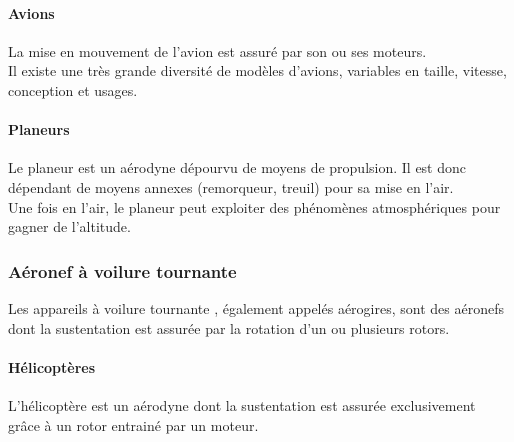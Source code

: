 		\paragraph{Avions}
		La mise en mouvement de l'avion  est assuré par son ou ses moteurs. \\
		
		Il existe une très grande diversité de modèles d'avions, variables en taille, vitesse, conception et usages. \\
		
	
		\paragraph{Planeurs}
		Le planeur  est un aérodyne dépourvu de moyens de propulsion. Il est donc dépendant de moyens annexes (remorqueur, treuil) pour sa mise en l'air. \\
		
		Une fois en l'air, le planeur peut exploiter des phénomènes atmosphériques pour gagner de l'altitude. \\
		
		
		
	\subsubsection{Aéronef à voilure tournante}
	Les appareils à voilure tournante , également appelés aérogires, sont des aéronefs dont la sustentation est assurée par la rotation d'un ou plusieurs rotors.
	
		\paragraph{Hélicoptères}
		L'hélicoptère  est un aérodyne dont la sustentation est assurée exclusivement grâce à un rotor entrainé par un moteur.
		
